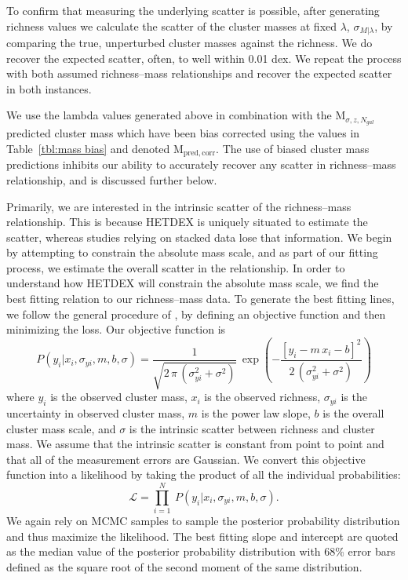 \documentclass[fleqn,usenatbib]{mnras}
\begin{document}
To confirm that measuring the underlying scatter is possible, after generating richness values we calculate the scatter of the cluster masses at fixed $\lambda$, $\sigma_{M|\lambda}$, by comparing the true, unperturbed cluster masses against the richness. We do recover the expected scatter, often, to well within 0.01 dex. We repeat the process with both assumed richness--mass relationships and recover the expected scatter in both instances. 

We use the lambda values generated above in combination with the $\mathrm{M}_{\sigma,z,N_{gal}}$ predicted cluster mass which have been bias corrected using the values in Table~\ref{tbl:mass bias} and denoted $\mathrm{M_{pred,corr}}$. The use of biased cluster mass predictions inhibits our ability to accurately recover any scatter in richness--mass relationship, and is discussed further below. 

Primarily, we are interested in the intrinsic scatter of the richness--mass relationship. This is because HETDEX is uniquely situated to estimate the scatter, whereas studies relying on stacked data  lose that information. We begin by attempting to constrain the absolute mass scale, and as part of our fitting process, we estimate the overall scatter in the relationship. In order to understand how HETDEX will constrain the absolute mass scale, we find the best fitting relation to our richness--mass data. To generate the best fitting lines, we follow the general procedure of \cite{Hogg2010}, by defining an objective function and then minimizing the loss. Our objective function is
\begin{equation}\label{eq:objectivei}
P(y_i|x_i,\sigma_{yi},m,b,\sigma) = \frac{1}{\sqrt{2\,\pi\,(\sigma_{yi}^2+\sigma^2)}}
 \,\exp\left(-\frac{[y_i - m\,x_i - b]^2}{2\,(\sigma_{yi}^2+\sigma^2)}\right)
\end{equation}
where $y_i$ is the observed cluster mass, $x_i$ is the observed richness, $\sigma_{yi}$ is the uncertainty in observed cluster mass, $m$ is the power law slope, $b$ is the overall cluster mass scale, and $\sigma$ is the intrinsic scatter between richness and cluster mass. We assume that the intrinsic scatter is constant from point to point and that all of the measurement errors are Gaussian. We convert this objective function into a likelihood by taking the product of all the individual probabilities:  
\begin{equation}\label{eq:like}
\mathscr{L} = \prod_{i=1}^N \ P(y_i|x_i,\sigma_{yi},m,b, \sigma).
\end{equation}
We again rely on MCMC samples to sample the posterior probability distribution and thus maximize the likelihood. The best fitting slope and intercept are quoted as the median value of the posterior probability distribution with 68\% error bars defined as the square root of the second moment of the same distribution.
\end{document}

